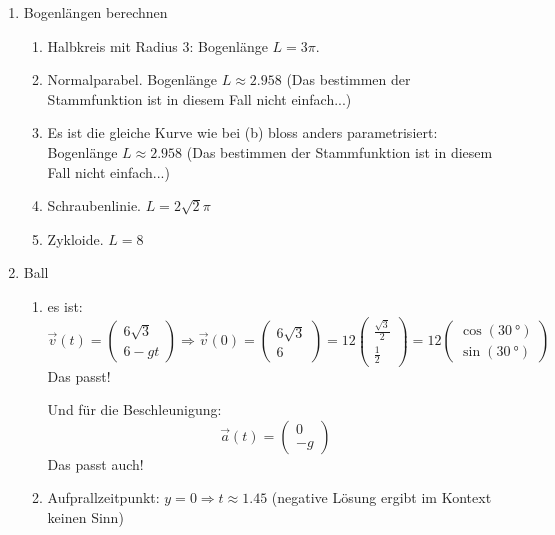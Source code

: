 \begin{enumerate}
    \item Bogenlängen berechnen
          \begin{enumerate}
              \item Halbkreis mit Radius 3: Bogenlänge \(L=3\pi\).
              \item Normalparabel. Bogenlänge \(L\approx 2.958\) (Das bestimmen der Stammfunktion ist in diesem Fall nicht einfach...)
              \item Es ist die gleiche Kurve wie bei (b) bloss anders parametrisiert: Bogenlänge \(L\approx 2.958\) (Das bestimmen der Stammfunktion ist in diesem Fall nicht einfach...)
              \item Schraubenlinie. \(L=2\sqrt{2}\pi\)
              \item Zykloide. \(L=8\)
          \end{enumerate}
    \item Ball
          \begin{enumerate}
              \item es ist:
                    \[
                        {\vec{v}(t)} = \begin{pmatrix}
                            6\sqrt{3} \\
                            6 - gt
                        \end{pmatrix}
                        \Rightarrow
                        \vec{v}(0) = \begin{pmatrix}
                            6\sqrt{3} \\
                            6
                        \end{pmatrix}
                        =
                        12\begin{pmatrix}
                            \frac{\sqrt{3}}{2} \\
                            \frac{1}{2}
                        \end{pmatrix}
                        =
                        12\begin{pmatrix}
                            \cos(\SI{30}{\degree}) \\
                            \sin(\SI{30}{\degree})
                        \end{pmatrix}
                    \]
                    Das passt!

                    Und für die Beschleunigung:
                    \[
                        {\vec{a}(t)} = \begin{pmatrix}
                            0 \\
                            - g
                        \end{pmatrix}
                    \]
                    Das passt auch!
              \item Aufprallzeitpunkt: \(y=0 \Rightarrow t \approx 1.45\) (negative Lösung ergibt im Kontext keinen Sinn)


\end{enumerate}
\end{enumerate}
